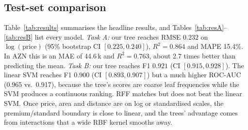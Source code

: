 \documentclass[10pt,twocolumn,a4paper]{article}
\begin{document}
\subsection{Test-set comparison}
\label{sec:bench}
Table~\ref{tab:results} summarises the headline results, and
Tables~\ref{tab:resA}--\ref{tab:resB} list every model. \emph{Task A:} our
tree reaches RMSE $0.232$ on $\log(\text{price})$ (95\% bootstrap CI
$[0.225, 0.240]$), $R^2=0.864$ and MAPE 15.4\%. In AZN this is an MAE of
44.6\,k and $R^2=0.763$, about 2.7 times better than predicting the mean.
\emph{Task B:} our tree reaches F1 $0.921$ (CI $[0.915, 0.928]$). The
linear SVM reaches F1 $0.900$ (CI $[0.893, 0.907]$) but a much higher
ROC-AUC (0.965 vs.\ 0.917), because the tree's scores are coarse leaf
frequencies while the SVM produces a continuous ranking. RFF matches but
does not beat the linear SVM. Once price, area and distance are on log or
standardised scales, the premium/standard boundary is close to linear, and
the trees' advantage comes from interactions that a wide RBF kernel
smooths away.

\begin{table}[t]
  \centering\small
  \caption{Headline results: test value (5-fold CV mean $\pm$ std).}
  \label{tab:results}
  \setlength{\tabcolsep}{3pt}
  
\end{table}

\begin{table}[t]
  \centering\small
  \caption{Task A, regression on $\log(\text{price})$, test set. CV = 5-fold
  mean $\pm$ std on train+val (the forests were not cross-validated, to save
  time). $^b$bonus. Fit time on one CPU core.}
  \label{tab:resA}
  
  \vspace{4pt}
  \caption{Task B, premium vs.\ standard tier, test set (positive class =
  premium). The majority baseline predicts ``standard'' for every row.}
  \label{tab:resB}
  
\end{table}
\end{document}
